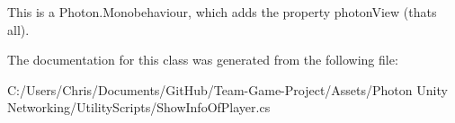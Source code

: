 This is a Photon.\+Monobehaviour, which adds the property photon\+View (that\textquotesingle{}s all). 

The documentation for this class was generated from the following file\+:\begin{DoxyCompactItemize}
\item 
C\+:/\+Users/\+Chris/\+Documents/\+Git\+Hub/\+Team-\/\+Game-\/\+Project/\+Assets/\+Photon Unity Networking/\+Utility\+Scripts/Show\+Info\+Of\+Player.\+cs\end{DoxyCompactItemize}
